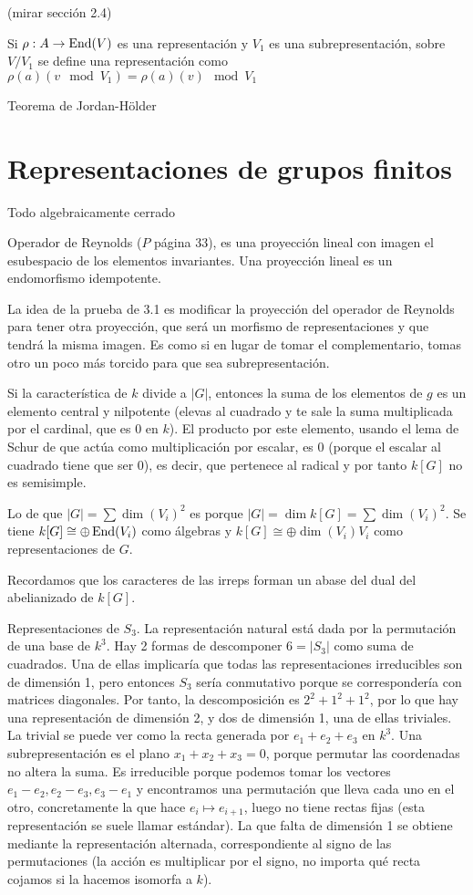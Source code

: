 \documentclass[ANAyTR.tex]{subfiles}
\begin{document}
 (mirar sección 2.4)
 
 Si $\rho:A\to\operatorname{End}(V)$ es una representación y $V_1$ es una subrepresentación, sobre $V/V_1$ se define una representación como $\rho(a)(v\mod V_1)=\rho(a)(v)\mod V_1$
 
 Teorema de Jordan-Hölder
 
 \section{Representaciones de grupos finitos}
 Todo algebraicamente cerrado 
 
 Operador de Reynolds ($P$ página 33), es una proyección lineal con imagen el esubespacio de los elementos invariantes. Una proyección lineal es un endomorfismo idempotente. 
 
 La idea de la prueba de 3.1 es modificar la proyección del operador de Reynolds para tener otra proyección, que será un morfismo de representaciones y que tendrá la misma imagen. Es como si en lugar de tomar el complementario, tomas otro un poco más torcido para que sea subrepresentación.
 
 Si la característica de $k$ divide a $|G|$, entonces la suma de los elementos de $g$ es un elemento central y nilpotente (elevas al cuadrado y te sale la suma multiplicada por el cardinal, que es 0 en $k$). El producto por este elemento, usando el lema de Schur de que actúa como multiplicación por escalar, es 0 (porque el escalar al cuadrado tiene que ser 0), es decir, que pertenece al radical y por tanto $k[G]$ no es semisimple. 
 
 Lo de que $|G|=\sum \dim(V_i)^2$ es porque $|G|=\dim k[G]=\sum\dim(V_i)^2$. Se tiene $k[G]\cong \oplus\operatorname{End}(V_i)$ como álgebras y $k[G]\cong\oplus\dim(V_i)V_i$ como representaciones de $G$. 
 
 Recordamos que los caracteres de las irreps forman un abase del dual del abelianizado de $k[G]$. 
 
 \begin{ej}
 
 Representaciones de $S_3$. La representación natural está dada por la permutación de una base de $k^3$. Hay 2 formas de descomponer $6=|S_3|$ como suma de cuadrados. Una de ellas implicaría que todas las representaciones irreducibles son de dimensión 1, pero entonces $S_3$ sería conmutativo porque se correspondería con matrices diagonales. Por tanto, la descomposición es $2^2+1^2+1^2$, por lo que hay una representación de dimensión 2, y dos de dimensión 1, una de ellas triviales. La trivial se puede ver como la recta generada por $e_1+e_2+e_3$ en $k^3$. Una subrepresentación es el plano $x_1+x_2+x_3=0$, porque permutar las coordenadas no altera la suma. Es irreducible porque podemos tomar los vectores $e_1-e_2, e_2-e_3,e_3-e_1$ y encontramos una permutación que lleva cada uno en el otro, concretamente la que hace $e_i\mapsto e_{i+1}$, luego no tiene rectas fijas (esta representación se suele llamar estándar). La que falta de dimensión 1 se obtiene mediante la representación alternada, correspondiente al signo de las permutaciones (la acción es multiplicar por el signo, no importa qué recta cojamos si la hacemos isomorfa a $k$).
 \end{ej}
 
\end{document}
